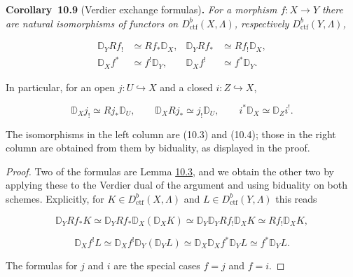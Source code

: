 \documentclass[11pt]{article}
\newenvironment{bpstatement}[2]{\par\addvspace{0.6\baselineskip}\noindent\textbf{#1}#2\textbf{.}\enspace\ignorespaces}
  {\par\addvspace{0.4\baselineskip}}
\newenvironment{bpstatementit}[2]{\begin{bpstatement}{#1}{#2}\itshape\ignorespaces}{\end{bpstatement}}
\begin{document}
\label{bp128}%
\begin{bpstatementit}{Corollary~10.9}{ (Verdier exchange formulas)}
For a morphism \(f:X\to Y\) there are natural isomorphisms of functors on \(D^b_{\mathrm{ctf}}(X,\Lambda)\), respectively \(D^b_{\mathrm{ctf}}(Y,\Lambda)\),

\[
\begin{aligned}
\mathbb D_YRf_!&\simeq Rf_*\mathbb D_X,&
\mathbb D_YRf_*&\simeq Rf_!\mathbb D_X,\\
\mathbb D_Xf^*&\simeq f^!\mathbb D_Y,&
\mathbb D_Xf^!&\simeq f^*\mathbb D_Y.
\end{aligned}
\]

In particular, for an open \(j:U\hookrightarrow X\) and a closed \(i:Z\hookrightarrow X\),

\[
\mathbb D_Xj_!\simeq Rj_*\mathbb D_U,\qquad
\mathbb D_XRj_*\simeq j_!\mathbb D_U,\qquad
i^*\mathbb D_X\simeq\mathbb D_Zi^!.
\]

The isomorphisms in the left column are (10.3) and (10.4); those in the right column are obtained from them by biduality, as displayed in the proof.
\end{bpstatementit}

\begin{proof}[{Proof}]\label{bp129}%
Two of the formulas are Lemma \hyperref[bp110]{10.3}, and we obtain the other two by applying these to the Verdier dual of the argument and using biduality on both schemes. Explicitly, for \(K\in D^b_{\mathrm{ctf}}(X,\Lambda)\) and \(L\in D^b_{\mathrm{ctf}}(Y,\Lambda)\) this reads

\[
\mathbb D_YRf_*K\simeq\mathbb D_YRf_*\mathbb D_X(\mathbb D_XK)
\simeq\mathbb D_Y\mathbb D_YRf_!\mathbb D_XK\simeq Rf_!\mathbb D_XK,
\]

\[
\mathbb D_Xf^!L\simeq\mathbb D_Xf^!\mathbb D_Y(\mathbb D_YL)
\simeq\mathbb D_X\mathbb D_Xf^*\mathbb D_YL\simeq f^*\mathbb D_YL.
\]

The formulas for \(j\) and \(i\) are the special cases \(f=j\) and \(f=i\).
\end{proof}


\end{document}
